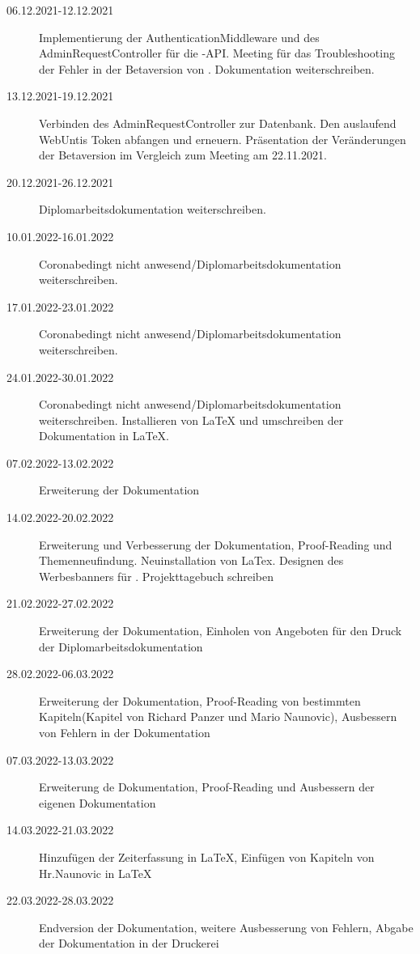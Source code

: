 \begin{description}
    \item[06.12.2021-12.12.2021] Implementierung der AuthenticationMiddleware und des AdminRequestController für die \ZELIA-API. Meeting für das Troubleshooting der Fehler in der Betaversion von \ZELIA. Dokumentation weiterschreiben. 
    \item[13.12.2021-19.12.2021] Verbinden des AdminRequestController zur Datenbank. Den auslaufend WebUntis Token abfangen und erneuern. Präsentation der Veränderungen der Betaversion im Vergleich zum Meeting am 22.11.2021.
    \item[20.12.2021-26.12.2021] Diplomarbeitsdokumentation weiterschreiben.
    \item[10.01.2022-16.01.2022] Coronabedingt nicht anwesend/Diplomarbeitsdokumentation weiterschreiben.
    \item[17.01.2022-23.01.2022] Coronabedingt nicht anwesend/Diplomarbeitsdokumentation weiterschreiben.
    \item[24.01.2022-30.01.2022] Coronabedingt nicht anwesend/Diplomarbeitsdokumentation weiterschreiben. Installieren von LaTeX und umschreiben der Dokumentation in LaTeX.
    \item[07.02.2022-13.02.2022] Erweiterung der Dokumentation
    \item[14.02.2022-20.02.2022] Erweiterung und Verbesserung der Dokumentation, Proof-Reading und Themenneufindung. Neuinstallation von LaTex. Designen des Werbesbanners für \ZELIA. Projekttagebuch schreiben
    \item[21.02.2022-27.02.2022] Erweiterung der Dokumentation, Einholen von Angeboten für den Druck der Diplomarbeitsdokumentation
    \item[28.02.2022-06.03.2022] Erweiterung der Dokumentation, Proof-Reading von bestimmten Kapiteln(Kapitel von Richard Panzer und Mario Naunovic), Ausbessern von Fehlern in der Dokumentation
    \item[07.03.2022-13.03.2022] Erweiterung de Dokumentation, Proof-Reading und Ausbessern der eigenen Dokumentation
    \item[14.03.2022-21.03.2022] Hinzufügen der Zeiterfassung in LaTeX, Einfügen von Kapiteln von Hr.Naunovic in LaTeX
    \item[22.03.2022-28.03.2022] Endversion der Dokumentation, weitere Ausbesserung von Fehlern, Abgabe der Dokumentation in der Druckerei
\end{description}